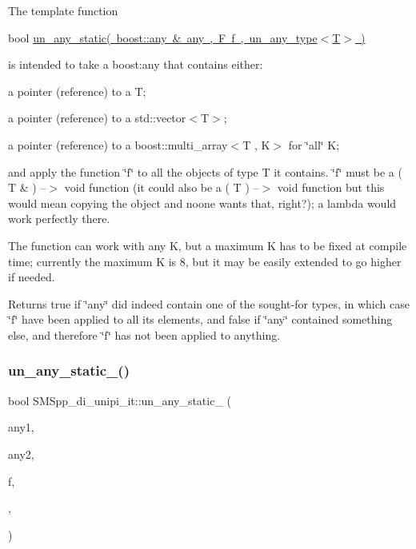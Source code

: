 The template function

bool \mbox{\hyperlink{group__boost__any__stuff_ga8ec1a694aa7a5fa58ab801c1ea419fa8}{un\+\_\+any\+\_\+static( boost\+::any \& any , F f , un\+\_\+any\+\_\+type$<$\+T$>$ )}}

is intended to take a boost\+:any that contains either\+:


\begin{DoxyItemize}
\item a pointer (reference) to a T;
\item a pointer (reference) to a std\+::vector$<$\+T$>$;
\item a pointer (reference) to a boost\+::multi\+\_\+array$<$\+T , K$>$ for \char`\"{}all\char`\"{} K;
\end{DoxyItemize}

and apply the function \char`\"{}f\char`\"{} to all the objects of type T it contains. \char`\"{}f\char`\"{} must be a ( T \& ) --$>$ void function (it could also be a ( T ) --$>$ void function but this would mean copying the object and noone wants that, right?); a lambda would work perfectly there.

The function can work with any K, but a maximum K has to be fixed at compile time; currently the maximum K is 8, but it may be easily extended to go higher if needed.

Returns true if \char`\"{}any\char`\"{} did indeed contain one of the sought-\/for types, in which case \char`\"{}f\char`\"{} have been applied to all its elements, and false if \char`\"{}any\char`\"{} contained something else, and therefore \char`\"{}f\char`\"{} has not been applied to anything. \mbox{\label{group__boost__any__stuff_ga69348da148035f5453d7c1db28f0578b}} 
\subsubsection{\texorpdfstring{un\+\_\+any\+\_\+static\+\_()}{un\_any\_static\_2()}}
{\footnotesize\ttfamily bool S\+M\+Spp\+\_\+di\+\_\+unipi\+\_\+it\+::un\+\_\+any\+\_\+static\+\_ (\begin{DoxyParamCaption}\item[{const boost\+::any \&}]{any1,  }\item[{const boost\+::any \&}]{any2,  }\item[{F}]{f,  }\item[{\mbox{\hyperlink{struct_s_m_spp__di__unipi__it_1_1un__any__type}{un\+\_\+any\+\_\+type}}$<$ T $>$}]{,  }\item[{\mbox{\hyperlink{struct_s_m_spp__di__unipi__it_1_1un__any__type}{un\+\_\+any\+\_\+type}}$<$ U $>$}]{ }\end{DoxyParamCaption})}

